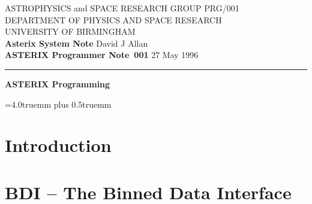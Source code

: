 \pagestyle{myheadings}
\newcommand{\astdoccategory}  {ASTERIX Programmer Note}
\newcommand{\astdocinitials}  {PRG}
\newcommand{\astdocnumber}    {001}
\newcommand{\astdocauthors}   {David J Allan}
\newcommand{\astdocdate}      {27 May 1996}
\newcommand{\astdoctitle}     {ASTERIX Programming}
\newcommand{\astdocname}      {\astdocinitials /\astdocnumber}
\renewcommand{\_}             {{\tt\char'137}}


\setlength{\textwidth}{160mm}           %
\setlength{\textheight}{240mm}          %
\setlength{\oddsidemargin}{0pt}         %
\setlength{\evensidemargin}{0pt}        %
\setlength{\topmargin}{-5mm}            %
\setlength{\headsep}{8mm}               %
\setlength{\parindent}{0mm}

\thispagestyle{empty}
ASTROPHYSICS and SPACE RESEARCH GROUP \hfill \astdocname \\
DEPARTMENT OF PHYSICS AND SPACE RESEARCH\\
UNIVERSITY OF BIRMINGHAM\\
{\large\bf Asterix System Note} \hfill \astdocauthors\\
{\large\bf \astdoccategory\ \astdocnumber} \hfill \astdocdate\\
\vspace{-4mm}
\rule{\textwidth}{0.5mm}
\vspace{5mm}
\begin{center}
{\huge\bf \astdoctitle}
\end{center}
\vspace{5mm}

\parskip=4.0truemm plus 0.5truemm       %

\markright{\astdocname}
\tableofcontents
\newpage

\chapter{Introduction}

\chapter{BDI -- The Binned Data Interface}

